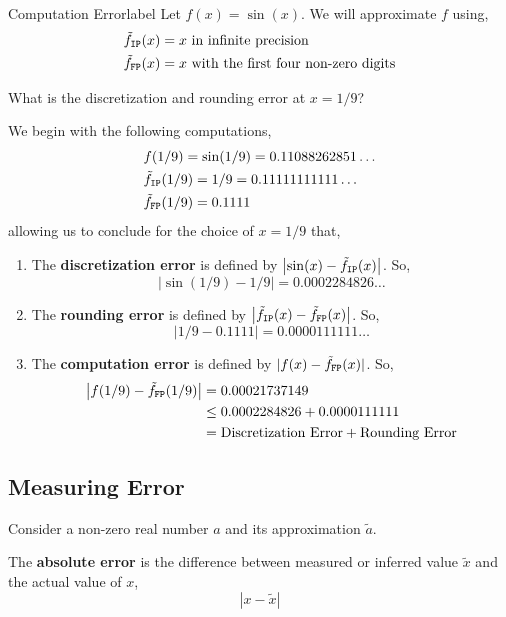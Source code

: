 \begin{ex}{Computation Error}{label}
    Let $f(x) = \sin (x)$. We will approximate $f$ using,
    \begin{align*}
        &\tilde{f}_{\texttt{IP}}(x) = x \text{ in infinite precision} \\
        &\tilde{f}_{\texttt{FP}}(x) = x \text{ with the first four non-zero digits}
    \end{align*}
    
   What is the discretization and rounding error at $x = 1/9$?
   
    \LineBreak
    
    We begin with the following computations,
    \begin{align*}
        &f(1 / 9)=\sin (1 / 9) = 0.11088262851 \ldots \\
        &\tilde{f}_{\texttt{IP}}(1 / 9) = 1 / 9 = 0.11111111111 \ldots \\
        &\tilde{f}_{\texttt{FP}}(1 / 9) = 0.1111
    \end{align*}
    allowing us to conclude for the choice of $x = 1/9$ that,
    \begin{enumerate}
        \item The \textbf{discretization error} is defined by $\left|\sin(x)-\tilde{f}_{\texttt{IP}}(x)\right|$. So,
        \[\left|\sin(1/9) - 1/9\right| = 0.0002284826 \ldots \]
        \item The \textbf{rounding error} is defined by $\left|\tilde{f}_{\texttt{IP}}(x)-\tilde{f}_{\texttt{FP}}(x)\right|$. So,
        \[\left|1/9 - 0.1111\right| = 0.0000111111 \ldots \]
        \item The \textbf{computation error} is defined by $|f(x)-\tilde{f}_{\texttt{FP}}(x)|$. So,
        \begin{align*}
            \left|f(1 / 9)-\tilde{f}_{\texttt{FP}}(1 / 9)\right| &= 0.00021737149 \\
            &\leq 0.0002284826+0.0000111111 \\
            &= \text {Discretization Error} + \text {Rounding Error}
        \end{align*}
    \end{enumerate}
\end{ex}

\subsection{Measuring Error}
Consider a non-zero real number $a$ and its approximation $\tilde{a}$.

\begin{defn}
    \sloppy The \textbf{absolute error} is the difference between measured or inferred value $\tilde{x}$ and the actual value of $x$,
    \[|x-\tilde{x}|\]
\end{defn}

